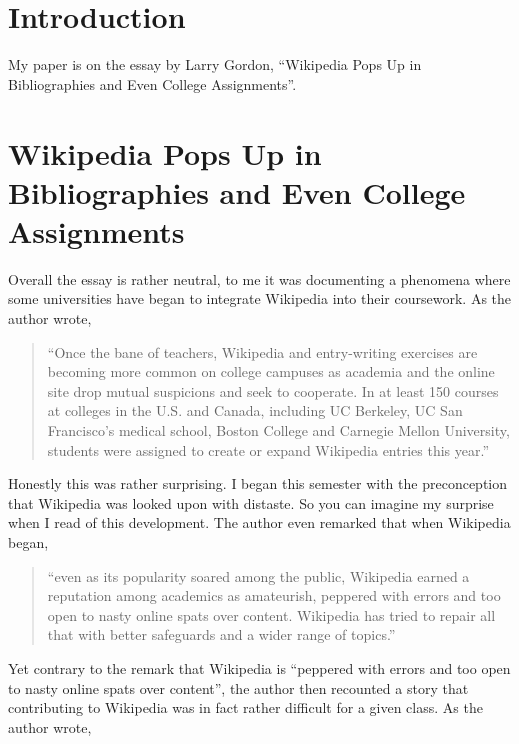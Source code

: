 
\section*{Introduction}

My paper is on the essay by Larry Gordon, ``Wikipedia Pops Up in Bibliographies and Even College Assignments''.

\section*{Wikipedia Pops Up in Bibliographies and Even College Assignments}

Overall the essay is rather neutral, to me it was documenting a phenomena where some universities have began to integrate Wikipedia into their coursework. As the author wrote,

\begin{quotation}
``Once the bane of teachers, Wikipedia and entry-writing exercises are becoming more common on college campuses as academia and the online site drop mutual suspicions and seek to cooperate. In at least 150 courses at colleges in the U.S. and Canada, including UC Berkeley, UC San Francisco’s medical school, Boston College and Carnegie Mellon University, students were assigned to create or expand Wikipedia entries this year.''
\end{quotation}

Honestly this was rather surprising. I began this semester with the preconception that Wikipedia was looked upon with distaste. So you can imagine my surprise when I read of this development. The author even remarked that when Wikipedia began,

\begin{quotation}
“even as its popularity soared among the public, Wikipedia earned a reputation among academics as amateurish, peppered with errors and too open to nasty online spats over content. Wikipedia has tried to repair all that with better safeguards and a wider range of topics.”
\end{quotation}


Yet contrary to the remark that Wikipedia is “peppered with errors and too open to nasty online spats over content”, the author then recounted a story that contributing to Wikipedia was in fact rather difficult for a given class. As the author wrote,

